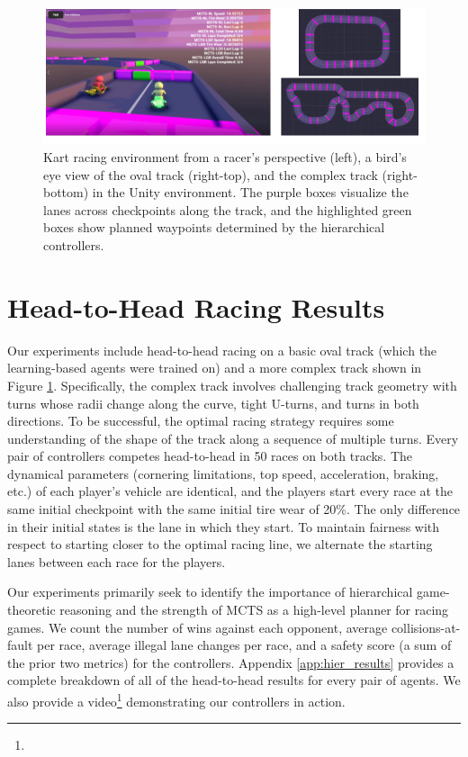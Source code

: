 \begin{figure}
  \centering
  \includegraphics[width=\textwidth]{Figures/UnityEnvironment.png}
  \caption[Screenshots of Unity simulation environment] {Kart racing environment from a racer's perspective (left), a bird's eye view of the oval track (right-top), and the complex track (right-bottom) in the Unity environment. The purple boxes visualize the lanes across checkpoints along the track, and the highlighted green boxes show planned waypoints determined by the hierarchical controllers.}
  \label{fig:experiment_tracks}
\end{figure}
\section{Head-to-Head Racing Results}
Our experiments include head-to-head racing on a basic oval track (which the learning-based agents were trained on) and a more complex track shown in Figure \ref{fig:experiment_tracks}. Specifically, the complex track involves challenging track geometry with turns whose radii change along the curve, tight U-turns, and turns in both directions. To be successful, the optimal racing strategy requires some understanding of the shape of the track along a sequence of multiple turns. Every pair of controllers competes head-to-head in 50 races on both tracks. The dynamical parameters (cornering limitations, top speed, acceleration, braking, etc.) of each player's vehicle are identical, and the players start every race at the same initial checkpoint with the same initial tire wear of 20\%. The only difference in their initial states is the lane in which they start. To maintain fairness with respect to starting closer to the optimal racing line, we alternate the starting lanes between each race for the players.

Our experiments primarily seek to identify the importance of hierarchical game-theoretic reasoning and the strength of MCTS as a high-level planner for racing games. We count the number of wins against each opponent, average collisions-at-fault per race, average illegal lane changes per race, and a safety score (a sum of the prior two metrics) for the controllers. Appendix \ref{app:hier_results} provides a complete breakdown of all of the head-to-head results for every pair of agents. We also provide a video\footnote{\vidurl} demonstrating our controllers in action. 

